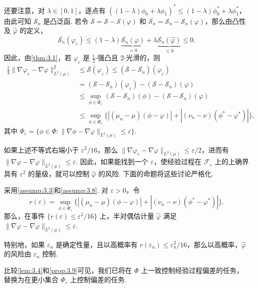 还要注意，对 $\lambda\in[0,1]$，逐点有 $((1-\lambda)\phi_0+\lambda\phi_1)^*\le(1-\lambda)\phi_0^*+\lambda\phi_1^*$，由此可知 $\mathcal S_n$ 是凸泛函. 若令 $\overline{\mathcal S}=\mathcal S-\mathcal S(\varphi)$ 和 $\overline{\mathcal S_n}=\mathcal S_n-\mathcal S_n(\varphi)$，那么由凸性及 $\widehat\varphi$ 的定义，
$$\overline{\mathcal S_n}(\varphi_\varepsilon)
\le(1-\lambda)\underbrace{\overline{\mathcal S_n}(\varphi)}_{=0}
+\lambda\underbrace{\overline{\mathcal S_n}(\widehat\varphi)}_{\le0}\le0.$$
因此，由\autoref{thm:3.1}，若 $\varphi_\varepsilon$ 是 $\frac12$-强凸且 2-光滑的，则
$$\begin{aligned}
\frac14\|\nabla\varphi_\varepsilon-\nabla\varphi\|_{L^2(\mu)}^2
&\le\overline{\mathcal S}(\varphi_\varepsilon)
\le(\overline{\mathcal S}-\overline{\mathcal S_n})(\varphi_\varepsilon)\\
&=(\mathcal S-\mathcal S_n)(\varphi_\varepsilon)-(\mathcal S-\mathcal S_n)(\varphi)\\
&\le\sup_{\phi\in\Phi_\varepsilon}(\mathcal S-\mathcal S_n)(\phi)
-(\mathcal S-\mathcal S_n)(\varphi)\\
&\le\sup_{\phi\in\Phi_\varepsilon}
\{|(\mu_n-\mu)(\phi-\varphi)|+|(\nu_n-\nu)(\phi^*-\varphi^*)|\},
\end{aligned}$$
其中 $\Phi_\varepsilon=\{\phi\in\Phi:\|\nabla\phi-\nabla\varphi\|_{L^2(\mu)}\le\varepsilon\}$.

如果上述不等式右端小于 $\varepsilon^2/16$，那么 $\|\nabla\varphi_\varepsilon-\nabla\varphi\|_{L^2(\mu)}\le\varepsilon/2$，进而有 $\|\nabla\widehat\varphi-\nabla\varphi\|_{L^2(\mu)}\le\varepsilon$. 因此，如果能找到一个 $\varepsilon$，使经验过程在 $\mathcal F_\varepsilon$ 上的上确界具有 $\varepsilon^2$ 的量级，就可以控制 $\widehat\varphi$ 的风险. 下面的命题将这些讨论严格化.
\begin{proposition}\label{prop:3.9}
采用\autoref{assump:3.3}和\autoref{assump:3.8}. 对 $\varepsilon>0$，令
$$r(\varepsilon)=\sup_{\phi\in\Phi_\varepsilon}
\{|(\mu_n-\mu)(\phi-\varphi)|+|(\nu_n-\nu)(\phi^*-\varphi^*)|\}.$$
那么，在事件 $\{r(\varepsilon)\le\varepsilon^2/16\}$ 上，半对偶估计量 $\widehat\varphi$ 满足 $\|\nabla\widehat\varphi-\nabla\varphi\|_{L^2(\mu)}\le\varepsilon$.

特别地，如果 $\varepsilon_n$ 是确定性量，且以高概率有 $r(\varepsilon_n)\le\varepsilon_n^2/16$，那么以高概率，$\widehat\varphi$ 的风险由 $\varepsilon_n$ 控制.
\end{proposition}

比较\autoref{lem:3.4}和\autoref{prop:3.9}可见，我们已将在 $\Phi$ 上一致控制经验过程偏差的任务，替换为在更小集合 $\Phi_\varepsilon$ 上控制偏差的任务.
